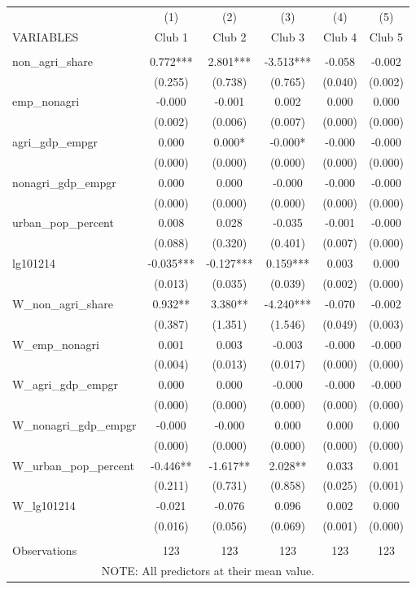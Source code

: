 \begin{tabular}{lccccc} \hline
 & (1) & (2) & (3) & (4) & (5) \\
VARIABLES & Club 1 & Club 2 & Club 3 & Club 4 & Club 5 \\ \hline
 &  &  &  &  &  \\
non\_agri\_share & 0.772*** & 2.801*** & -3.513*** & -0.058 & -0.002 \\
 & (0.255) & (0.738) & (0.765) & (0.040) & (0.002) \\
emp\_nonagri & -0.000 & -0.001 & 0.002 & 0.000 & 0.000 \\
 & (0.002) & (0.006) & (0.007) & (0.000) & (0.000) \\
agri\_gdp\_empgr & 0.000 & 0.000* & -0.000* & -0.000 & -0.000 \\
 & (0.000) & (0.000) & (0.000) & (0.000) & (0.000) \\
nonagri\_gdp\_empgr & 0.000 & 0.000 & -0.000 & -0.000 & -0.000 \\
 & (0.000) & (0.000) & (0.000) & (0.000) & (0.000) \\
urban\_pop\_percent & 0.008 & 0.028 & -0.035 & -0.001 & -0.000 \\
 & (0.088) & (0.320) & (0.401) & (0.007) & (0.000) \\
lg101214 & -0.035*** & -0.127*** & 0.159*** & 0.003 & 0.000 \\
 & (0.013) & (0.035) & (0.039) & (0.002) & (0.000) \\
W\_non\_agri\_share & 0.932** & 3.380** & -4.240*** & -0.070 & -0.002 \\
 & (0.387) & (1.351) & (1.546) & (0.049) & (0.003) \\
W\_emp\_nonagri & 0.001 & 0.003 & -0.003 & -0.000 & -0.000 \\
 & (0.004) & (0.013) & (0.017) & (0.000) & (0.000) \\
W\_agri\_gdp\_empgr & 0.000 & 0.000 & -0.000 & -0.000 & -0.000 \\
 & (0.000) & (0.000) & (0.000) & (0.000) & (0.000) \\
W\_nonagri\_gdp\_empgr & -0.000 & -0.000 & 0.000 & 0.000 & 0.000 \\
 & (0.000) & (0.000) & (0.000) & (0.000) & (0.000) \\
W\_urban\_pop\_percent & -0.446** & -1.617** & 2.028** & 0.033 & 0.001 \\
 & (0.211) & (0.731) & (0.858) & (0.025) & (0.001) \\
W\_lg101214 & -0.021 & -0.076 & 0.096 & 0.002 & 0.000 \\
 & (0.016) & (0.056) & (0.069) & (0.001) & (0.000) \\
 &  &  &  &  &  \\
 Observations & 123 & 123 & 123 & 123 & 123 \\ \hline
\multicolumn{6}{c}{ NOTE: All predictors at their mean value.} \\
\end{tabular}
